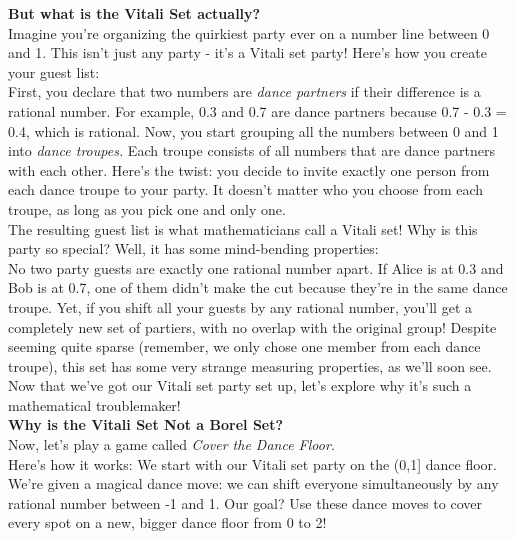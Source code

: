 \textbf{But what is the Vitali Set actually?}\\

Imagine you're organizing the quirkiest party ever on a number line between 0 and 1. This isn't just any party - it's a Vitali set party! Here's how you create your guest list: \\

First, you declare that two numbers are \textit{dance partners} if their difference is a rational number. For example, 0.3 and 0.7 are dance partners because 0.7 - 0.3 = 0.4, which is rational. Now, you start grouping all the numbers between 0 and 1 into \textit{dance troupes.} Each troupe consists of all numbers that are dance partners with each other. Here's the twist: you decide to invite exactly one person from each dance troupe to your party. It doesn't matter who you choose from each troupe, as long as you pick one and only one. \\

The resulting guest list is what mathematicians call a Vitali set! Why is this party so special? Well, it has some mind-bending properties: \\

No two party guests are exactly one rational number apart. If Alice is at 0.3 and Bob is at 0.7, one of them didn't make the cut because they're in the same dance troupe. Yet, if you shift all your guests by any rational number, you'll get a completely new set of partiers, with no overlap with the original group! Despite seeming quite sparse (remember, we only chose one member from each dance troupe), this set has some very strange measuring properties, as we'll soon see. \\

Now that we've got our Vitali set party set up, let's explore why it's such a mathematical troublemaker! \\

\textbf{Why is the Vitali Set Not a Borel Set?}\\

Now, let's play a game called \textit{Cover the Dance Floor.} \\

Here's how it works: We start with our Vitali set party on the (0,1] dance floor. We're given a magical dance move: we can shift everyone simultaneously by any rational number between -1 and 1. Our goal? Use these dance moves to cover every spot on a new, bigger dance floor from 0 to 2!\\

